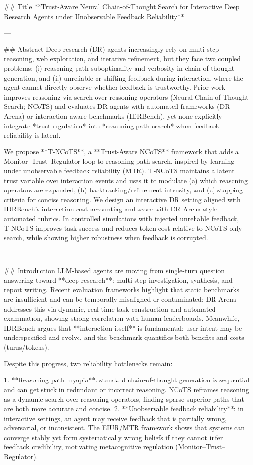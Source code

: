 ## Title  
**Trust-Aware Neural Chain-of-Thought Search for Interactive Deep Research Agents under Unobservable Feedback Reliability**

---

## Abstract  
Deep research (DR) agents increasingly rely on multi-step reasoning, web exploration, and iterative refinement, but they face two coupled problems: (i) reasoning-path suboptimality and verbosity in chain-of-thought generation, and (ii) unreliable or shifting feedback during interaction, where the agent cannot directly observe whether feedback is trustworthy. Prior work improves reasoning via search over reasoning operators (Neural Chain-of-Thought Search; NCoTS) and evaluates DR agents with automated frameworks (DR-Arena) or interaction-aware benchmarks (IDRBench), yet none explicitly integrate *trust regulation* into *reasoning-path search* when feedback reliability is latent.  

We propose **T-NCoTS**, a **Trust-Aware NCoTS** framework that adds a Monitor–Trust–Regulator loop to reasoning-path search, inspired by learning under unobservable feedback reliability (MTR). T‑NCoTS maintains a latent trust variable over interaction events and uses it to modulate (a) which reasoning operators are expanded, (b) backtracking/refinement intensity, and (c) stopping criteria for concise reasoning. We design an interactive DR setting aligned with IDRBench’s interaction-cost accounting and score with DR-Arena-style automated rubrics. In controlled simulations with injected unreliable feedback, T‑NCoTS improves task success and reduces token cost relative to NCoTS-only search, while showing higher robustness when feedback is corrupted.

---

## Introduction  
LLM-based agents are moving from single-turn question answering toward **deep research**: multi-step investigation, synthesis, and report writing. Recent evaluation frameworks highlight that static benchmarks are insufficient and can be temporally misaligned or contaminated; DR-Arena addresses this via dynamic, real-time task construction and automated examination, showing strong correlation with human leaderboards. Meanwhile, IDRBench argues that **interaction itself** is fundamental: user intent may be underspecified and evolve, and the benchmark quantifies both benefits and costs (turns/tokens).

Despite this progress, two reliability bottlenecks remain:

1. **Reasoning path myopia**: standard chain-of-thought generation is sequential and can get stuck in redundant or incorrect reasoning. NCoTS reframes reasoning as a dynamic search over reasoning operators, finding sparse superior paths that are both more accurate and concise.
2. **Unobservable feedback reliability**: in interactive settings, an agent may receive feedback that is partially wrong, adversarial, or inconsistent. The EIUR/MTR framework shows that systems can converge stably yet form systematically wrong beliefs if they cannot infer feedback credibility, motivating metacognitive regulation (Monitor–Trust–Regulator).

